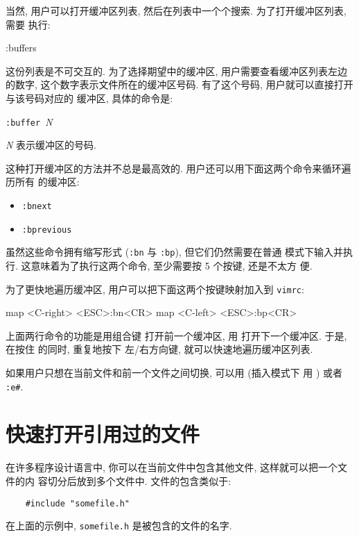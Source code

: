 当然, 用户可以打开缓冲区列表, 然后在列表中一个个搜索. 为了打开缓冲区列表, 需要
执行:
\begin{vimcode}
:buffers
\end{vimcode}

这份列表是不可交互的. 为了选择期望中的缓冲区, 用户需要查看缓冲区列表左边的数字,
这个数字表示文件所在的缓冲区号码. 有了这个号码, 用户就可以直接打开与该号码对应的
缓冲区, 具体的命令是:
\begin{vimcmdform}
\texttt{:buffer }\textit{N}
\end{vimcmdform}
\textit{N} 表示缓冲区的号码.

这种打开缓冲区的方法并不总是最高效的. 用户还可以用下面这两个命令来循环遍历所有
的缓冲区:
\begin{itemize}
    \item \texttt{:bnext}
    \item \texttt{:bprevious}
\end{itemize}

虽然这些命令拥有缩写形式 (\texttt{:bn} 与 \texttt{:bp}), 但它们仍然需要在普通
模式下输入并执行. 这意味着为了执行这两个命令, 至少需要按 5 个按键, 还是不太方
便.

为了更快地遍历缓冲区, 用户可以把下面这两个按键映射加入到 \texttt{vimrc}:
\begin{vimcode}
map <C-right> <ESC>:bn<CR>
map <C-left> <ESC>:bp<CR>
\end{vimcode}
上面两行命令的功能是用组合键  打开前一个缓冲区, 用
 打开下一个缓冲区. 于是, 在按住  的同时, 重复地按下
左/右方向键, 就可以快速地遍历缓冲区列表.

\begin{warning}
    如果用户只想在当前文件和前一个文件之间切换, 可以用  (插入模式下
    用  ) 或者 \texttt{:e\#}.
\end{warning}

\section{快速打开引用过的文件}
\label{sec:open_referenced_files_faster}

在许多程序设计语言中, 你可以在当前文件中包含其他文件, 这样就可以把一个文件的内
容切分后放到多个文件中. 文件的包含类似于:
\begin{verbatim}
    #include "somefile.h"
\end{verbatim}
在上面的示例中, \texttt{somefile.h} 是被包含的文件的名字.

